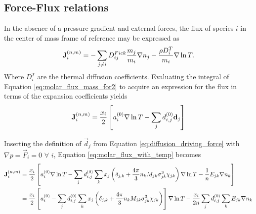 \subsection{Force-Flux relations}

In the absence of a pressure gradient and external forces, the flux of species $i$ in the center of mass frame of reference may be expressed as
\begin{equation}
    \boldsymbol{\mathrm{J}}^{(n,m)}_i = - \sum_{j \neq i} D_{ij}^{Fick} \frac{m_j}{m_i} \nabla n_j - \frac{\rho D_i^T}{m_i} \nabla \ln T.
    \label{eq:DTi_def}
\end{equation} 
Where $D_i^T$ are the thermal diffusion coefficients. Evaluating the integral of Equation \eqref{eq:molar_flux_mass_for2} to acquire an expression for the flux in terms of the expansion coefficients yields
\begin{equation}
    \boldsymbol{\mathrm{J}}^{(n,m)}_i = \frac{x_i}{2} \left[ a_i^{(0)} \nabla \ln T - \sum_j d_{i, j}^{(0)} \boldsymbol{\mathrm{d}}_j \right]
    \label{eq:molar_flux_with_temp}
\end{equation}

Inserting the definition of $\Vec{d}_j$ from Equation \eqref{eq:diffusion_driving_force} with $\nabla p = \Vec{F}_i = 0$ $\forall$ $i$, Equation \eqref{eq:molar_flux_with_temp} becomes
\begin{equation}
    \begin{split}
        \boldsymbol{\mathrm{J}}^{(n,m)}_i &= \frac{x_i}{2} \left[ a_i^{(0)} \nabla \ln T - \sum_j d_{i, j}^{(0)} \sum_k x_j \left( \delta_{j,k} + \frac{4 \pi}{3} n_k M_{jk} \sigma_{jk}^3 \chi_{jk}\right) \nabla \ln T - \frac{1}{n} E_{jk} \nabla n_k \right] \\
        &=  \frac{x_i}{2} \left[ a_i^{(0)} - \sum_j d_{i, j}^{(0)} \sum_k x_j \left( \delta_{j,k} + \frac{4 \pi}{3} n_k M_{jk} \sigma_{jk}^3 \chi_{jk}\right) \right] \nabla \ln T - \frac{x_i}{2n} \sum_j d_{i, j}^{(0)} \sum_k E_{jk} \nabla n_k
    \end{split}
    \label{eq:mflux_com_expanded}
\end{equation}

